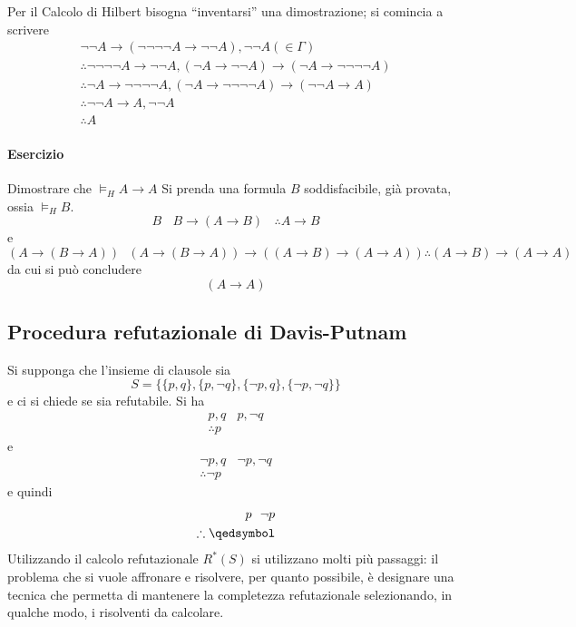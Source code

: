 Per il Calcolo di Hilbert bisogna ``inventarsi'' una dimostrazione; si 
comincia a scrivere 
\begin{align*}
\neg \neg A \rightarrow (\neg \neg \neg \neg A \rightarrow \neg \neg A), \neg \neg A ( \in \Gamma)\\
\therefore \neg \neg \neg \neg A \rightarrow \neg \neg A, (  \neg A \rightarrow \neg \neg A) \rightarrow (\neg A \rightarrow \neg \neg \neg \neg A)\\
\therefore \neg A \rightarrow \neg \neg \neg \neg A, (\neg A \rightarrow \neg \neg \neg \neg A) \rightarrow ( \neg \neg A \rightarrow A) \\
\therefore  \neg \neg A \rightarrow A, \neg \neg A \\
\therefore A
\end{align*}

\paragraph{Esercizio}
Dimostrare che $\models_H A \rightarrow A$
Si prenda una formula $B$ soddisfacibile, già provata, ossia $\models_H B$. 
$$
B ~~~~ B \rightarrow (A \rightarrow B) ~~~~ \therefore A \rightarrow B
$$
e 
$$
(A \rightarrow (B \rightarrow A)) ~~~ (A \rightarrow (B \rightarrow A)) \rightarrow ((A \rightarrow B) \rightarrow (A \rightarrow A))
\therefore (A\rightarrow B) \rightarrow (A \rightarrow A)
$$
da cui si può concludere 
$$
(A \rightarrow A)
$$
\subsection{Procedura refutazionale di Davis-Putnam}
Si supponga che l'insieme di clausole sia 
$$
S = \{\{p,q\}, \{p, \neg q\}, \{\neg p, q\}, \{\neg p, \neg q\}\} 
$$
e ci si chiede se sia refutabile.
Si ha 
\begin{align*}
        p,q ~~~~ p, \neg q \\
        \therefore p 
\end{align*}
e 
\begin{align*}
        \neg p, q  ~~~~ \neg p, \neg q \\
        \therefore \neg p
\end{align*}
e quindi 
\begin{align*}
        p ~~ \neg p \\
        \therefore \qedsymbol
\end{align*}
Utilizzando il calcolo refutazionale $R^*(S)$ si utilizzano molti più passaggi: 
il problema che si vuole affronare e risolvere, per quanto possibile, è 
designare una tecnica che permetta di mantenere la completezza 
refutazionale selezionando, in qualche modo, i risolventi da calcolare. 

